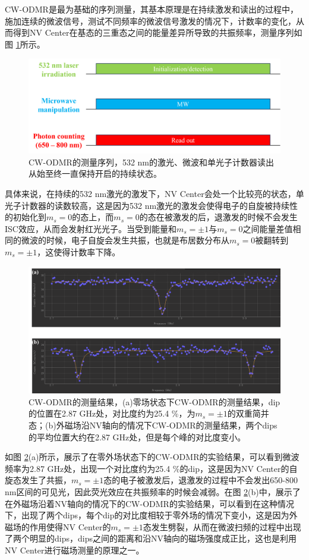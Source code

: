 \documentclass[type = bachelor]{whu-thesis}
\begin{document}
CW-ODMR是最为基础的序列测量，其基本原理是在持续激发和读出的过程中，施加连续的微波信号，测试不同频率的微波信号激发的情况下，计数率的变化，从而得到NV Center在基态的三重态之间的能量差异所导致的共振频率，测量序列如图 \ref{fig: CW-ODMR_seq}所示。
\begin{figure}
  \centering
  \includegraphics[width=1.0\textwidth]{figures/Chapter 1/CW-ODMR_seq.png}
  \caption[CW-ODMR的测量序列]{CW-ODMR的测量序列，532 nm的激光、微波和单光子计数器读出从始至终一直保持开启的持续状态。}
  \label{fig: CW-ODMR_seq}
\end{figure}
具体来说，在持续的532 nm激光的激发下，NV Center会处一个比较亮的状态，单光子计数器的读数较高，这是因为532 nm激光的激发会使得电子的自旋被持续性的初始化到$m_s=0$的态上，而$m_s=0$的态在被激发的后，退激发的时候不会发生ISC效应，从而会发射红光光子。当受到能量和$m_s=\pm1$与$m_s=0$之间能量差值相同的微波的时候，电子自旋会发生共振，也就是布居数分布从$m_s=0$被翻转到$m_s=\pm1$，这使得计数率下降。
\begin{figure}
  \centering
  \includegraphics[width=1.0\textwidth]{figures/Chapter 1/CW-ODMR_results.png}
  \caption[CW-ODMR的测量结果]{CW-ODMR的测量结果，(a)零场状态下CW-ODMR的测量结果，dip的位置在2.87 GHz处，对比度约为25.4 \%，为$m_s=\pm1$的双重简并态；(b)外磁场沿NV轴向的情况下CW-ODMR的测量结果，两个dips的平均位置大约在2.87 GHz处，但是每个峰的对比度变小。}
  \label{fig: CW-ODMR_results}
\end{figure}
如图 \ref{fig: CW-ODMR_results}(a)所示，展示了在零外场状态下的CW-ODMR的实验结果，可以看到微波频率为2.87 GHz处，出现一个对比度约为25.4 \%的dip，这是因为NV Center的自旋态发生了共振，$m_s=\pm1$态的电子被激发后，退激发的过程中不会发出650-800 nm区间的可见光，因此荧光效应在共振频率的时候会减弱。在图 \ref{fig: CW-ODMR_results}(b)中，展示了在外磁场沿着NV轴向的情况下的CW-ODMR的实验结果，可以看到在这种情况下，出现了两个dips，每个dip的对比度相较于零外场的情况下变小，这是因为外磁场的作用使得NV Center的$m_s=\pm1$态发生劈裂，从而在微波扫频的过程中出现了两个明显的dips，dips之间的距离和沿NV轴向的磁场强度成正比，这也是利用NV Center进行磁场测量的原理之一。
\end{document}
